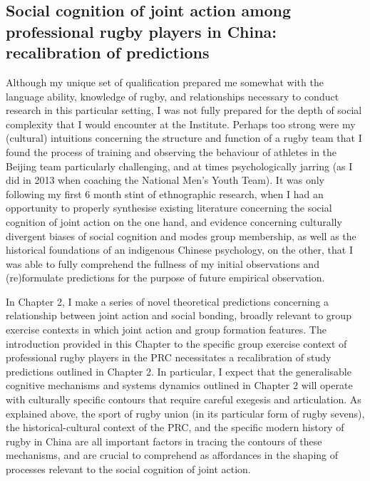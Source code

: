 {\subsection{Social cognition of joint action among professional rugby players in China: recalibration of predictions}
Although my unique set of qualification prepared me somewhat with the language ability, knowledge of rugby, and relationships necessary to conduct research in this particular setting, I was not fully prepared for the depth of social complexity that I would encounter at the Institute.  Perhaps too strong were my (cultural) intuitions concerning the structure and function of a rugby team that I found the process of training and observing the behaviour of athletes in the Beijing team particularly challenging, and at times psychologically jarring (as I did in 2013 when coaching the National Men's Youth Team).  It was only following my first 6 month stint of ethnographic research, when I had an opportunity to properly synthesise existing literature concerning the social cognition of joint action on the one hand, and evidence concerning culturally divergent biases of social cognition and modes group membership, as well as the historical foundations of an indigenous Chinese psychology, on the other, that I was able to fully comprehend the fullness of my initial observations and (re)formulate predictions for the purpose of future empirical observation.

In Chapter 2, I make a series of novel theoretical predictions concerning a relationship between joint action and social bonding, broadly relevant to group exercise contexts in which joint action and group formation features.  The introduction provided in this Chapter to the specific group exercise context of professional rugby players in the PRC necessitates a recalibration of study predictions outlined in Chapter 2.  In particular, I expect that the generalisable cognitive mechanisms and systems dynamics outlined in Chapter 2 will operate with culturally specific contours that require careful exegesis and articulation.  As explained above, the sport of rugby union (in its particular form of rugby sevens), the historical-cultural context of the PRC, and the specific modern history of rugby in China are all important factors in tracing the contours of these mechanisms, and are crucial to comprehend as affordances in the shaping of processes relevant to the social cognition of joint action.

}
